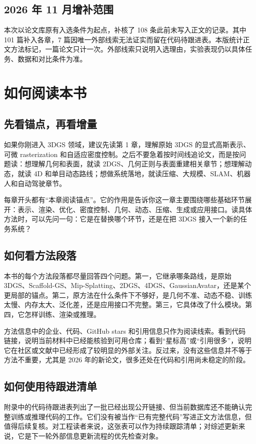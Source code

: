 \section*{2026 年 11 月增补范围}

本次以论文库原有入选条件为起点，补核了 108 条此前未写入正文的记录。其中 101 篇补入各章，7 篇因唯一外部线索无法证实而留在代码待跟进表。本版统计正文方法标记，一篇论文只计一次。外部线索只说明入选理由，实验表现仍以具体任务、数据和对比条件为准。

\chapter{如何阅读本书}

\section*{先看锚点，再看增量}

如果你刚进入 3DGS 领域，建议先读第 1 章，理解原始 3DGS 的显式高斯表示、可微 rasterization 和自适应密度控制。之后不要急着按时间线追论文，而是按问题读：想理解几何和表面，就读 2DGS、几何正则与表面重建相关章节；想理解动态，就读 4D 和单目动态路线；想做系统落地，就读压缩、大规模、SLAM、机器人和自动驾驶章节。

每章开头都有“本章阅读锚点”。它的作用是告诉你这一章主要围绕哪些基础环节展开：表示、渲染、优化、密度控制、几何、动态、压缩、生成或应用接口。读具体方法时，可以先问一句：它是在替换哪个环节，还是在把 3DGS 接入一个新的任务系统？

\section*{如何看方法段落}

本书的每个方法段落都尽量回答四个问题。第一，它继承哪条路线，是原始 3DGS、Scaffold-GS、Mip-Splatting、2DGS、4DGS、GaussianAvatar，还是某个更局部的锚点。第二，原方法在什么条件下不够好，是几何不准、动态不稳、训练太慢、内存太大、泛化差，还是应用接口不完整。第三，它具体改了什么模块。第四，它怎样训练、渲染或推理。

方法信息中的企业、代码、GitHub stars 和引用信息只作为阅读线索。看到代码链接，说明当前材料中已经能核验到可用仓库；看到“星标高”或“引用很多”，说明它在社区或文献中已经形成了较明显的外部关注。反过来，没有这些信息并不等于方法不重要，尤其是 2026 年的新论文，很多还处在代码和引用尚未稳定的阶段。

\section*{如何使用待跟进清单}

附录中的代码待跟进表列出了一批已经出现公开链接、但当前数据库还不能确认完整训练或推理代码的工作。它们没有被当作“已有完整代码”写进正文方法信息，但值得后续复核。对工程读者来说，这张表可以作为持续跟踪清单；对综述更新来说，它是下一轮外部信息更新流程的优先检查对象。
